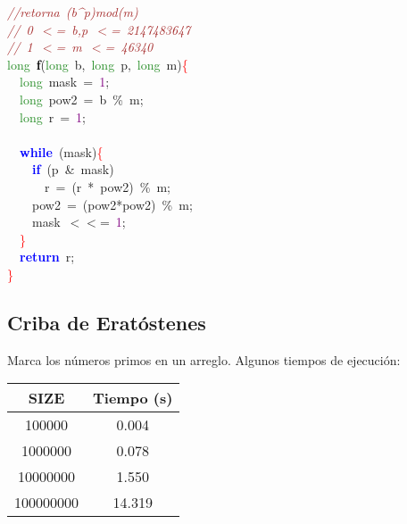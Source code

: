 \documentclass[10pt,a4paper,twoside]{article}
\begin{document}
{\ttfamily \raggedright {
\noindent
\mbox{}\textit{\textcolor{Brown}{//retorna\ (b\textasciicircum{}p)mod(m)}} \\
\mbox{}\textit{\textcolor{Brown}{//\ 0\ $<$=\ b,p\ $<$=\ 2147483647}} \\
\mbox{}\textit{\textcolor{Brown}{//\ 1\ $<$=\ m\ $<$=\ 46340}} \\
\mbox{}\textcolor{ForestGreen}{long}\ \textbf{\textcolor{Black}{f}}\textcolor{BrickRed}{(}\textcolor{ForestGreen}{long}\ b\textcolor{BrickRed}{,}\ \textcolor{ForestGreen}{long}\ p\textcolor{BrickRed}{,}\ \textcolor{ForestGreen}{long}\ m\textcolor{BrickRed}{)}\textcolor{Red}{\{} \\
\mbox{}\ \ \textcolor{ForestGreen}{long}\ mask\ \textcolor{BrickRed}{=}\ \textcolor{Purple}{1}\textcolor{BrickRed}{;} \\
\mbox{}\ \ \textcolor{ForestGreen}{long}\ pow2\ \textcolor{BrickRed}{=}\ b\ \textcolor{BrickRed}{\%}\ m\textcolor{BrickRed}{;} \\
\mbox{}\ \ \textcolor{ForestGreen}{long}\ r\ \textcolor{BrickRed}{=}\ \textcolor{Purple}{1}\textcolor{BrickRed}{;} \\
\mbox{} \\
\mbox{}\ \ \textbf{\textcolor{Blue}{while}}\ \textcolor{BrickRed}{(}mask\textcolor{BrickRed}{)}\textcolor{Red}{\{} \\
\mbox{}\ \ \ \ \textbf{\textcolor{Blue}{if}}\ \textcolor{BrickRed}{(}p\ \textcolor{BrickRed}{\&}\ mask\textcolor{BrickRed}{)} \\
\mbox{}\ \ \ \ \ \ r\ \textcolor{BrickRed}{=}\ \textcolor{BrickRed}{(}r\ \textcolor{BrickRed}{*}\ pow2\textcolor{BrickRed}{)}\ \textcolor{BrickRed}{\%}\ m\textcolor{BrickRed}{;} \\
\mbox{}\ \ \ \ pow2\ \textcolor{BrickRed}{=}\ \textcolor{BrickRed}{(}pow2\textcolor{BrickRed}{*}pow2\textcolor{BrickRed}{)}\ \textcolor{BrickRed}{\%}\ m\textcolor{BrickRed}{;} \\
\mbox{}\ \ \ \ mask\ \textcolor{BrickRed}{$<<$=}\ \textcolor{Purple}{1}\textcolor{BrickRed}{;} \\
\mbox{}\ \ \textcolor{Red}{\}} \\
\mbox{}\ \ \textbf{\textcolor{Blue}{return}}\ r\textcolor{BrickRed}{;} \\
\mbox{}\textcolor{Red}{\}} \\

} \normalfont\normalsize

\subsection{Criba de Eratóstenes}
Marca los números primos en un arreglo. Algunos tiempos de ejecución:
\begin{center}
\begin{tabular}{c c}
\hline\hline
SIZE & Tiempo (s) \\ [0.5ex]
\hline
100000 & 0.004 \\
1000000 & 0.078 \\
10000000 & 1.550 \\
100000000 & 14.319 \\ [1ex]
\hline
\end{tabular}
\end{center}


}
\end{document}

